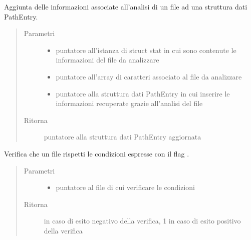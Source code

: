 \documentclass[letterpaper,10pt,italian,openany,oneside]{sphinxmanual}
\begin{document}
\begin{fulllineitems}
\label{\detokenize{code/inputscan:c.addFileAnalisis}}
Aggiunta delle informazioni associate all’analisi di un file ad una struttura dati PathEntry.
\begin{quote}\begin{description}
\item[{Parametri}] \leavevmode\begin{itemize}
\item {} 
 \textendash{} puntatore all’istanza di struct stat in cui sono contenute le informazioni del file da analizzare

\item {} 
 \textendash{} puntatore all’array di caratteri associato al file da analizzare

\item {} 
 \textendash{} puntatore alla struttura dati PathEntry in cui inserire le informazioni recuperate grazie all’analisi del file

\end{itemize}

\item[{Ritorna}] \leavevmode
puntatore alla struttura dati PathEntry aggiornata

\end{description}\end{quote}

\end{fulllineitems}


\begin{fulllineitems}
\label{\detokenize{code/inputscan:c.checkLength}}
Verifica che un file rispetti le condizioni espresse con il flag .
\begin{quote}\begin{description}
\item[{Parametri}] \leavevmode\begin{itemize}
\item {} 
 \textendash{} puntatore al file di cui verificare le condizioni

\end{itemize}

\item[{Ritorna}]  in caso di esito negativo della verifica, 1 in caso di esito positivo della verifica

\end{description}\end{quote}

\end{fulllineitems}
\end{document}
